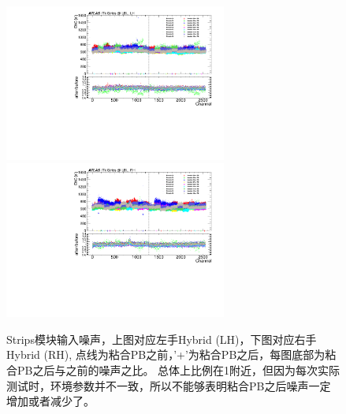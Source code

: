 \begin{figure}[h]
\centering
 \includegraphics[width=0.65\textwidth, angle=-90]{fig/LH_noise.pdf} \\
  \includegraphics[width=0.65\textwidth, angle=-90]{fig/RH_noise.pdf} 
 \caption{Strips模块输入噪声，上图对应左手Hybrid (LH)，下图对应右手Hybrid (RH), 点线为粘合PB之前，'+'为粘合PB之后，每图底部为粘合PB之后与之前的噪声之比。
 总体上比例在1附近，但因为每次实际测试时，环境参数并不一致，所以不能够表明粘合PB之后噪声一定增加或者减少了。}
 \label{fig:strips_testing_noise}
\end{figure}
